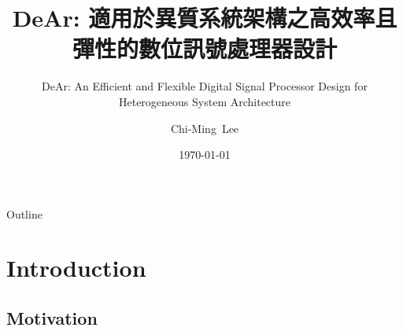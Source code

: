 \documentclass{beamer}
\author{Chi-Ming~Lee}
\institute[NTHU EE] %
{
    Department of Electrial Engineering\\
    National Tsing Hua University
}
\date{\today}
\begin{document}
\begin{CJK}{UTF8}{bkai}

    \title[DeAr DSP]{ DeAr: 適用於異質系統架構之高效率且彈性的數位訊號處理器設計}
    \subtitle{DeAr: An Efficient and Flexible Digital Signal Processor Design for Heterogeneous System Architecture}

    \begin{frame}
        \titlepage
    \end{frame}

    \begin{frame}{Outline}
        \tableofcontents
    \end{frame}


    \section{Introduction}

    \subsection{Motivation}


\end{CJK}
\end{document}
